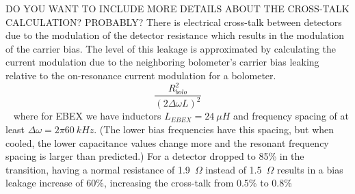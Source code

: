 DO YOU WANT TO INCLUDE MORE DETAILS ABOUT THE CROSS-TALK CALCULATION? PROBABLY? 
There is electrical cross-talk between detectors due to the modulation of the detector resistance which results in the modulation of the carrier bias. 
The level of this leakage is approximated by calculating the current modulation due to the neighboring bolometer's carrier bias leaking relative to the on-resonance current modulation for a bolometer. 
\begin{equation}
\frac{R_{bolo}^2}{(2\Delta \omega L)^2}
\end{equation}
~\cite{Dobbs2011}
where for \ac{EBEX} we have inductors $L_{EBEX} = 24~\mu H$ and frequency spacing of at least $\Delta \omega = 2\pi 60~kHz$. 
(The lower bias frequencies have this spacing, but when cooled, the lower capacitance values change more and the resonant frequency spacing is larger than predicted.)
For a detector dropped to 85\% in the transition, having a normal resistance of 1.9~$\Omega$ instead of 1.5~$\Omega$ results in a bias leakage increase of 60\%, increasing the cross-talk from 0.5\% to 0.8\%




